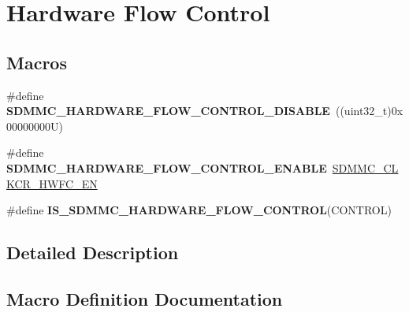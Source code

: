\hypertarget{group___s_d_m_m_c___l_l___hardware___flow___control}{}\section{Hardware Flow Control}
\label{group___s_d_m_m_c___l_l___hardware___flow___control}
\subsection*{Macros}
\begin{DoxyCompactItemize}
\item 
\mbox{\label{group___s_d_m_m_c___l_l___hardware___flow___control_gaa563be70cf65523edf6459fb0842cab1}} 
\#define {\bfseries S\+D\+M\+M\+C\+\_\+\+H\+A\+R\+D\+W\+A\+R\+E\+\_\+\+F\+L\+O\+W\+\_\+\+C\+O\+N\+T\+R\+O\+L\+\_\+\+D\+I\+S\+A\+B\+LE}~((uint32\+\_\+t)0x00000000\+U)
\item 
\mbox{\label{group___s_d_m_m_c___l_l___hardware___flow___control_ga403057f2e07254d7e295128fbdb6939d}} 
\#define {\bfseries S\+D\+M\+M\+C\+\_\+\+H\+A\+R\+D\+W\+A\+R\+E\+\_\+\+F\+L\+O\+W\+\_\+\+C\+O\+N\+T\+R\+O\+L\+\_\+\+E\+N\+A\+B\+LE}~\mbox{\hyperlink{group___peripheral___registers___bits___definition_ga73898c6efbc8f7962ba99dc8ae678473}{S\+D\+M\+M\+C\+\_\+\+C\+L\+K\+C\+R\+\_\+\+H\+W\+F\+C\+\_\+\+EN}}
\item 
\#define {\bfseries I\+S\+\_\+\+S\+D\+M\+M\+C\+\_\+\+H\+A\+R\+D\+W\+A\+R\+E\+\_\+\+F\+L\+O\+W\+\_\+\+C\+O\+N\+T\+R\+OL}(C\+O\+N\+T\+R\+OL)
\end{DoxyCompactItemize}


\subsection{Detailed Description}


\subsection{Macro Definition Documentation}
\mbox{\label{group___s_d_m_m_c___l_l___hardware___flow___control_ga5d3fa499b6a540323e76576c8562fd05}} 
